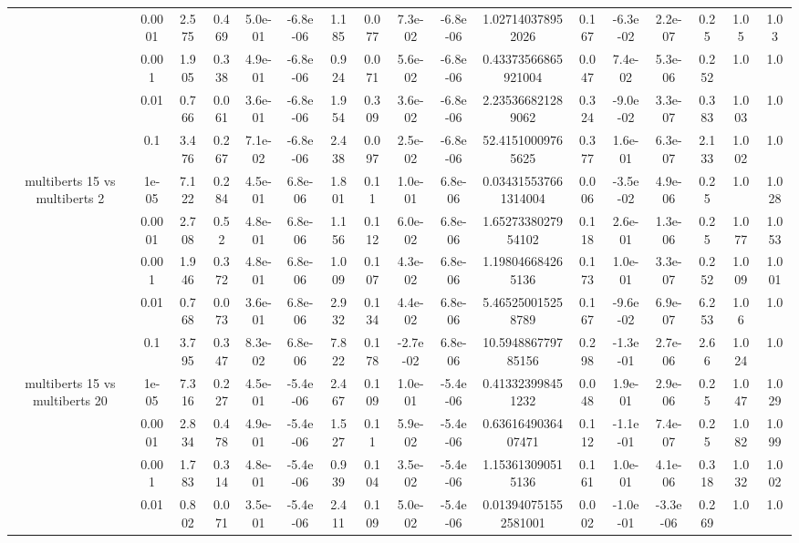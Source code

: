 \begin{tabular}{|c|c|c|c|c|c|c|c|c|c|c|c|c|c|c|c|c|}
 & 0.0001 & 2.575 & 0.469 & 5.0e-01 & -6.8e-06 & 1.185 & 0.077 & 7.3e-02 & -6.8e-06 & 1.027140378952026 & 0.167 & -6.3e-02 & 2.2e-07 & 0.25 & 1.05 & 1.03 \\
 & 0.001 & 1.905 & 0.338 & 4.9e-01 & -6.8e-06 & 0.924 & 0.071 & 5.6e-02 & -6.8e-06 & 0.43373566865921004 & 0.047 & 7.4e-02 & 5.3e-06 & 0.252 & 1.0 & 1.0 \\
 & 0.01 & 0.766 & 0.061 & 3.6e-01 & -6.8e-06 & 1.954 & 0.309 & 3.6e-02 & -6.8e-06 & 2.235366821289062 & 0.324 & -9.0e-02 & 3.3e-07 & 0.383 & 1.003 & 1.0 \\
 & 0.1 & 3.476 & 0.267 & 7.1e-02 & -6.8e-06 & 2.438 & 0.097 & 2.5e-02 & -6.8e-06 & 52.41510009765625 & 0.377 & 1.6e-01 & 6.3e-07 & 2.133 & 1.002 & 1.0 \\
\hline
\multirow{5}{*}{multiberts 15 vs multiberts 2} & 1e-05 & 7.122 & 0.284 & 4.5e-01 & 6.8e-06 & 1.801 & 0.11 & 1.0e-01 & 6.8e-06 & 0.034315537661314004 & 0.006 & -3.5e-02 & 4.9e-06 & 0.25 & 1.0 & 1.028 \\
 & 0.0001 & 2.708 & 0.52 & 4.8e-01 & 6.8e-06 & 1.156 & 0.112 & 6.0e-02 & 6.8e-06 & 1.6527338027954102 & 0.118 & 2.6e-01 & 1.3e-06 & 0.25 & 1.077 & 1.053 \\
 & 0.001 & 1.946 & 0.372 & 4.8e-01 & 6.8e-06 & 1.009 & 0.107 & 4.3e-02 & 6.8e-06 & 1.198046684265136 & 0.173 & 1.0e-01 & 3.3e-07 & 0.252 & 1.009 & 1.001 \\
 & 0.01 & 0.768 & 0.073 & 3.6e-01 & 6.8e-06 & 2.932 & 0.134 & 4.4e-02 & 6.8e-06 & 5.465250015258789 & 0.167 & -9.6e-02 & 6.9e-07 & 6.253 & 1.06 & 1.0 \\
 & 0.1 & 3.795 & 0.347 & 8.3e-02 & 6.8e-06 & 7.822 & 0.178 & -2.7e-02 & 6.8e-06 & 10.594886779785156 & 0.298 & -1.3e-01 & 2.7e-06 & 2.66 & 1.024 & 1.0 \\
\hline
\multirow{5}{*}{multiberts 15 vs multiberts 20} & 1e-05 & 7.316 & 0.227 & 4.5e-01 & -5.4e-06 & 2.467 & 0.109 & 1.0e-01 & -5.4e-06 & 0.413323998451232 & 0.048 & 1.9e-01 & 2.9e-06 & 0.25 & 1.047 & 1.029 \\
 & 0.0001 & 2.834 & 0.478 & 4.9e-01 & -5.4e-06 & 1.527 & 0.11 & 5.9e-02 & -5.4e-06 & 0.6361649036407471 & 0.112 & -1.1e-01 & 7.4e-07 & 0.25 & 1.082 & 1.099 \\
 & 0.001 & 1.783 & 0.314 & 4.8e-01 & -5.4e-06 & 0.939 & 0.104 & 3.5e-02 & -5.4e-06 & 1.153613090515136 & 0.161 & 1.0e-01 & 4.1e-06 & 0.318 & 1.032 & 1.002 \\
 & 0.01 & 0.802 & 0.071 & 3.5e-01 & -5.4e-06 & 2.411 & 0.109 & 5.0e-02 & -5.4e-06 & 0.013940751552581001 & 0.002 & -1.0e-01 & -3.3e-06 & 0.269 & 1.0 & 1.0 \\

\end{tabular}
